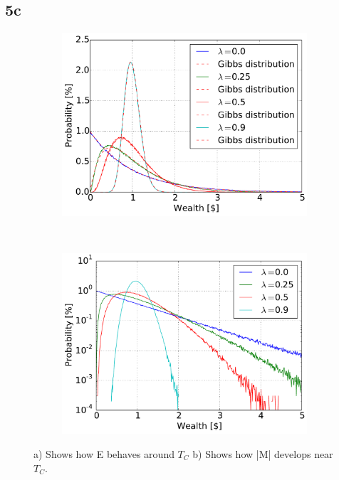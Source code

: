 \pagebreak
\subsection{5c}
\begin{figure}[H]
    \centering
    \begin{subfigure}{0.5\textwidth}
        \centering
        \includegraphics[width=\linewidth]{result/bilder/5c}
        \caption{}
    \end{subfigure}%
    ~ 
    \begin{subfigure}{0.5\textwidth}
        \centering
        \includegraphics[width=\linewidth]{result/bilder/5c-log}
        \caption{}
    \end{subfigure}
    \caption{a) Shows how E behaves around $T_C$ b) Shows how |M| develops near $T_C$.}
    \label{fig:5c}
\end{figure}





























